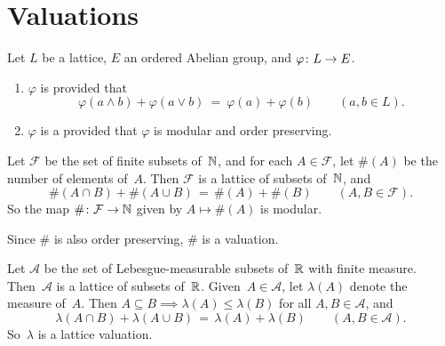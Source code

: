 \documentclass[main.tex]{subfiles}
\begin{document}
\section{Valuations}
\noindent
%
%
\begin{dfn}
\label{D:val}
Let $L$ be a lattice, $E$ an ordered Abelian group,
and $\varphi\colon L \rightarrow E$.
\begin{enumerate}
\item
\label{D:val-mod}
$\varphi$ is  provided that
\begin{equation*}
\varphi(a\wedge b) + \varphi(a \vee b)
\ =\ 
\varphi(a) + \varphi(b)
\qquad(a,b\in L).
\end{equation*}

\item
\label{D:val-val}
$\varphi$ is a 
provided that $\varphi$ is modular and order preserving.
\end{enumerate}
\end{dfn}

\begin{ex}
Let $\mathcal{F}$ be the set of finite subsets of~$\mathbb{N}$,
and for each $A\in \mathcal{F}$,
let $\#(A)$ be the number of elements of~$A$.
Then
$\mathcal{F}$ is a lattice of subsets of~$\mathbb{N}$,
and
\begin{equation*}
\#(A\cap B) + \#(A\cup B) \,=\, \#(A) + \#(B)
\qquad(A,B\in\mathcal{F}).
\end{equation*}
So the map $\#\colon \mathcal{F}\rightarrow \mathbb{N}$
given by $A\mapsto \#(A)$ is modular.

Since $\#$ is also order preserving,
$\#$ is a valuation.
\end{ex}

\begin{ex}
\label{E:lmeas-val}
Let $\mathcal{A}$ be the set of Lebesgue-measurable
subsets of~$\mathbb{R}$ with finite measure.
Then~$\mathcal{A}$ is a lattice of subsets of~$\mathbb{R}$.
Given~$A\in\mathcal{A}$,
let $\lambda(A)$ denote the measure of~$A$.
Then $A\subseteq B \implies \lambda(A)\leq \lambda (B)$
for all $A,B\in \mathcal{A}$,
and 
\begin{equation*}
\lambda(A\cap B) + \lambda(A\cup B) \,=\, \lambda(A) + \lambda(B)
\qquad(A,B\in\mathcal{A}).
\end{equation*}
So~$\lambda$ is a lattice valuation.
\end{ex}
\end{document}
